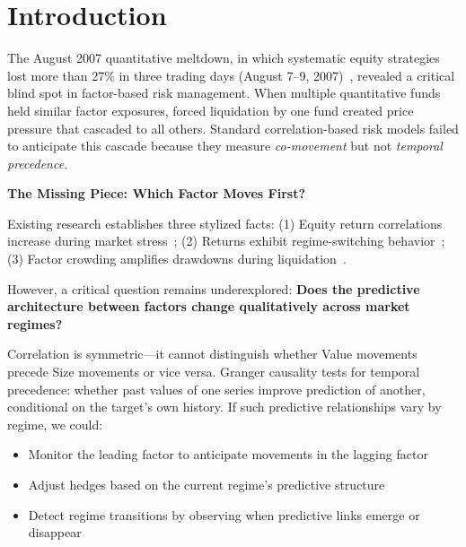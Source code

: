 \documentclass[sigconf,anonymous]{acmart}
\begin{document}


\maketitle

\section{Introduction}

The August 2007 quantitative meltdown, in which systematic equity strategies lost
more than 27\% in three trading days (August 7--9, 2007)~\cite{khandani2011quants}, revealed a critical
blind spot in factor-based risk management.
When multiple quantitative funds held similar factor exposures, forced liquidation
by one fund created price pressure that cascaded to all others.
Standard correlation-based risk models failed to anticipate this cascade because they
measure \emph{co-movement} but not \emph{temporal precedence}.

\textbf{The Missing Piece: Which Factor Moves First?}

Existing research establishes three stylized facts:
(1) Equity return correlations increase during market stress~\cite{ang2002asymmetric};
(2) Returns exhibit regime-switching behavior~\cite{hamilton1989new};
(3) Factor crowding amplifies drawdowns during liquidation~\cite{stein2009presidential}.

However, a critical question remains underexplored: \textbf{Does the predictive
architecture between factors change qualitatively across market regimes?}

Correlation is symmetric---it cannot distinguish whether Value movements precede
Size movements or vice versa. Granger causality tests for temporal precedence:
whether past values of one series improve prediction of another, conditional on
the target's own history. If such predictive relationships vary by regime, we could:
\begin{itemize}
    \item Monitor the leading factor to anticipate movements in the lagging factor
    \item Adjust hedges based on the current regime's predictive structure
    \item Detect regime transitions by observing when predictive links emerge or disappear
\end{itemize}
\end{document}
